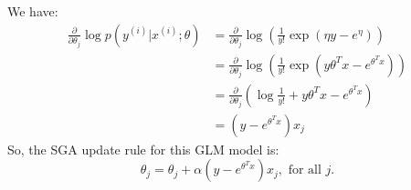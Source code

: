 \begin{answer}
We have:
\begin{align}
	\frac{\partial}{\partial \theta_j} \log p(y^{(i)}|x^{(i)}; \theta) 
	&= \frac{\partial}{\partial \theta_j} \log \left( \frac{1}{y!} \exp (\eta y - e^{\eta}) \right) \\
	&= \frac{\partial}{\partial \theta_j} \log \left( \frac{1}{y!} \exp (y \theta^T x - e^{\theta^T x}) \right) \\
	&= \frac{\partial}{\partial \theta_j} \left( \log \frac{1}{y!} + y \theta^T x - e^{\theta^T x} \right) \\
	&= (y - e^{\theta^T x}) x_j
\end{align}
So, the SGA update rule for this GLM model is:
$$ \theta_j = \theta_j + \alpha (y - e^{\theta^T x}) x_j, \text{ for all } j. $$ \\
\end{answer}
